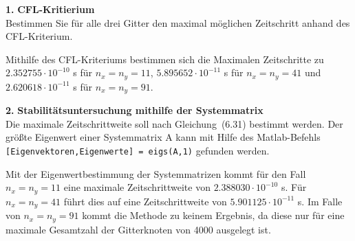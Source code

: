 \documentclass[Protokollheft.tex]{subfiles}
\begin{document}
\begin{framed}
	\noindent \textbf{1.} \textbf{CFL-Kritierium}\\
Bestimmen Sie für alle drei Gitter den maximal möglichen Zeitschritt anhand des CFL-Kriterium.\label{exer:calcDeltaTmaxWithCFL}
\end{framed}
\noindent
Mithilfe des CFL-Kriteriums bestimmen sich die Maximalen Zeitschritte zu $2.352755\cdot 10^{-10}$ s für $n_x = n_y = 11$, $5.895652 \cdot 10^{-11}$ s für $n_x = n_y = 41$ und $2.620618 \cdot 10^{-11}$ s für $n_x = n_y = 91$.
\begin{framed}
	\noindent \textbf{2.} \textbf{Stabilitätsuntersuchung mithilfe der Systemmatrix}\\
Die maximale Zeitschrittweite soll nach Gleichung~(6.31) bestimmt werden.
Der größte Eigenwert einer Systemmatrix A kann mit Hilfe
des Matlab-Befehls\\
\lstinline{[Eigenvektoren,Eigenwerte] = eigs(A,1)} gefunden werden.\label{exer:calcDeltaTmaxWithEV}
\end{framed}
\noindent
Mit der Eigenwertbestimmung der Systemmatrizen kommt für den Fall $n_x=n_y =11$ eine maximale Zeitschrittweite von $2.388030 \cdot 10^{-10}$ s. Für $n_x=n_y=41$ führt dies auf eine Zeitschrittweite von $5.901125\cdot 10^{-11} $ s. Im Falle von $n_x=n_y=91$ kommt die Methode zu keinem Ergebnis, da diese nur für eine maximale Gesamtzahl der Gitterknoten von 4000 ausgelegt ist.
\end{document}
